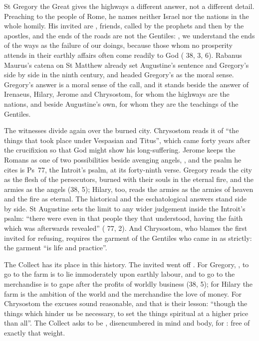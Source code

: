 St Gregory the Great gives the highways a different answer, not a different
detail. Preaching to the people of Rome, he names neither Israel nor the
nations in the whole homily. His invited are , friends, called by
the prophets and then by the apostles, and the ends of the roads are not the
Gentiles: , we understand the ends of the ways as the failure of our doings,
because those whom no prosperity attends in their earthly affairs often come
readily to God ( 38, 3, 6). Rabanus Maurus's catena
on St Matthew already set Augustine's sentence and Gregory's side by side in
the ninth century, and headed Gregory's as the moral sense. Gregory's answer is
a moral sense of the call, and it stands beside the answer of Irenaeus, Hilary,
Jerome and Chrysostom, for whom the highways are the nations, and beside
Augustine's own, for whom they are the teachings of the Gentiles.

The witnesses divide again over the burned city. Chrysostom reads it of ``the
things that took place under Vespasian and Titus'', which came forty years
after the crucifixion so that God might show his long-suffering. Jerome keeps
the Romans as one of two possibilities beside avenging angels, , and the psalm he cites
is Ps~77, the Introit's psalm, at its forty-ninth verse. Gregory reads the city
as the flesh of the persecutors, burned with their souls in the eternal fire,
and the armies as the angels (38, 5); Hilary, too, reads the armies as the
armies of heaven and the fire as eternal. The historical and the eschatological
answers stand side by side. St Augustine sets the limit to any wider judgement
inside the Introit's psalm: ``there were even in that people they that
understood, having the faith which was afterwards revealed''
( 77, 2). And Chrysostom, who blames the first invited for
refusing, requires the garment of the Gentiles who came in as strictly: the
garment ``is life and practice''.

The Collect has its place in this history. The invited went off . For Gregory, , to go to the farm is to lie
immoderately upon earthly labour, and to go to the merchandise is to gape after
the profits of worldly business (38, 5); for Hilary the farm is the ambition of
the world and the merchandise the love of money. For Chrysostom the excuses
sound reasonable, and that is their lesson: ``though the things which
hinder us be necessary, to set the things spiritual at a higher price than
all''. The Collect asks to be , disencumbered in mind and body,
for : free of exactly that weight.

